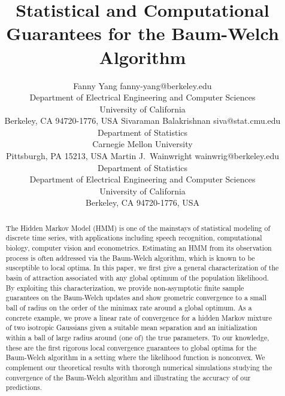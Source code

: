 \documentclass[twoside,11pt]{article}
\begin{document}
\title{Statistical and Computational Guarantees for the Baum-Welch Algorithm}

\author{\name Fanny Yang \email fanny-yang@berkeley.edu \\
       \addr Department of Electrical Engineering and Computer Sciences\\
       University of California\\
       Berkeley, CA 94720-1776, USA
       \AND
       \name Sivaraman Balakrishnan \email siva@stat.cmu.edu \\
       \addr Department of Statistics\\
       Carnegie Mellon University\\
       Pittsburgh, PA 15213, USA
       \AND
       \name Martin J.\ Wainwright \email wainwrig@berkeley.edu \\
       \addr Department of Statistics\\
       Department of Electrical Engineering and Computer Sciences\\
       University of California\\
       Berkeley, CA 94720-1776, USA}


\maketitle

\begin{abstract}%
The Hidden Markov Model (HMM) is one of the mainstays of statistical
modeling of discrete time series, with applications including speech
recognition, computational biology, computer vision and econometrics.
Estimating an HMM from its observation process is often addressed via
the Baum-Welch algorithm, which is known to be susceptible to local
optima.  In this paper, we first give a general characterization of
the basin of attraction associated with any global optimum of the
population likelihood.  By exploiting this characterization, we
provide non-asymptotic finite sample guarantees on the Baum-Welch
updates and show geometric convergence to a small ball of radius
on the order of the minimax rate around a global optimum.  As a
concrete example, we prove a linear rate of convergence for a hidden
Markov mixture of two isotropic Gaussians given a suitable mean
separation and an initialization within a ball of large radius around
(one of) the true parameters.  To our knowledge, these are the first
rigorous local convergence guarantees to global optima for the Baum-Welch algorithm in
a setting where the likelihood function is nonconvex.  We complement
our theoretical results with thorough numerical simulations studying
the convergence of the Baum-Welch algorithm and illustrating the
accuracy of our predictions.
\end{abstract}
\end{document}
